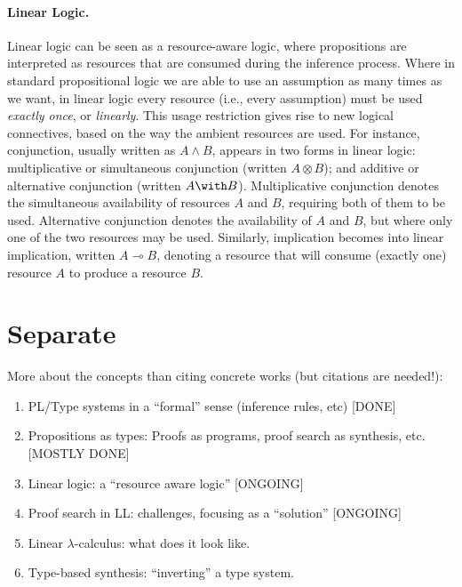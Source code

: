 \documentclass{llncs}
\newcommand{\lolli}{\multimap}
\newcommand{\tensor}{\otimes}
\newcommand{\mypara}[1]{\paragraph{\textbf{#1}.}}
\begin{document}
 




\mypara{Linear Logic}

Linear logic \cite{DBLP:journals/tcs/Girard87} can be seen as a
resource-aware logic, where propositions are interpreted as resources
that are consumed during the inference process.  Where in standard
propositional logic we are able to use an assumption as many times as
we want, in linear logic every resource (i.e., every assumption) must
be used \emph{exactly once}, or \emph{linearly}. This usage
restriction gives rise to new logical connectives, based on the way
the ambient resources are used. For instance, conjunction, usually
written as $A\wedge B$, appears in two forms in linear logic:
multiplicative or simultaneous conjunction (written $A\tensor B$); and
additive or alternative conjunction (written $A\with
B$). Multiplicative conjunction denotes the simultaneous availability
of resources $A$ and $B$, requiring both of them to be
used. Alternative conjunction denotes the availability of $A$ and $B$,
but where only one of the two resources may be used. Similarly,
implication becomes into linear implication, written $A\lolli B$,
denoting a resource that will consume (exactly one) resource $A$ to
produce a resource $B$.





\section{Separate}

More about the concepts than citing concrete works (but citations are
needed!):
\begin{enumerate}
\item PL/Type systems in a ``formal'' sense (inference rules, etc) [DONE]
\item Propositions as types: Proofs as programs, proof search as
  synthesis, etc. [MOSTLY DONE]
\item Linear logic: a ``resource aware logic'' [ONGOING]
\item Proof search in LL: challenges, focusing as a ``solution'' [ONGOING]
\item Linear $\lambda$-calculus: what does it look like.
\item Type-based synthesis: ``inverting'' a type system.
\end{enumerate}
\end{document}
